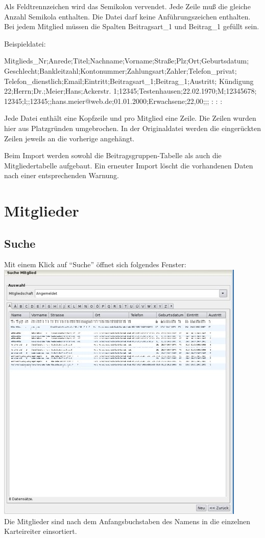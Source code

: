 \documentclass[a4paper,BCOR30mm,DIV14,pdftex,liststotoc,footsepline,openany]{scrbook}
\begin{document}
Als Feldtrennzeichen wird das Semikolon vervendet. Jede Zeile muß die gleiche Anzahl Semikola enthalten. 
Die Datei darf keine Anführungszeichen enthalten. Bei jedem Mitglied müssen die Spalten Beitragsart\_1 und Beitrag\_1 gefüllt sein.

Beispieldatei:\\
\begin{verbatim*}
Mitglieds_Nr;Anrede;Titel;Nachname;Vorname;Straße;Plz;Ort;Geburtsdatum;
    Geschlecht;Bankleitzahl;Kontonummer;Zahlungsart;Zahler;Telefon_privat;
    Telefon_dienstlich;Email;Eintritt;Beitragsart_1;Beitrag_1;Austritt;
    Kündigung
22;Herrn;Dr.;Meier;Hans;Ackerstr. 1;12345;Testenhausen;22.02.1970;M;12345678;
    12345;l;;12345;;hans.meier@web.de;01.01.2000;Erwachsene;22,00;;;
:
:
:
\end{verbatim*} 
Jede Datei enthält eine Kopfzeile und pro Mitglied eine Zeile. Die Zeilen wurden hier aus Platzgründen umgebrochen. In der Originaldatei werden die eingerückten Zeilen jeweils an die vorherige angehängt.

Beim Import werden sowohl die Beitragsgruppen-Tabelle als auch die Mitgliedertabelle aufgebaut. Ein erneuter Import löscht die vorhandenen Daten nach einer entsprechenden Warnung.



\chapter{Mitglieder}
\section{Suche}
Mit einem Klick auf ``Suche'' öffnet sich folgendes Fenster:\\
\includegraphics{./screenshots/mitgliedsuchen.jpg}\\
Die Mitglieder sind nach dem Anfangsbuchstaben des Namens in die einzelnen Karteireiter einsortiert. 
\end{document}
